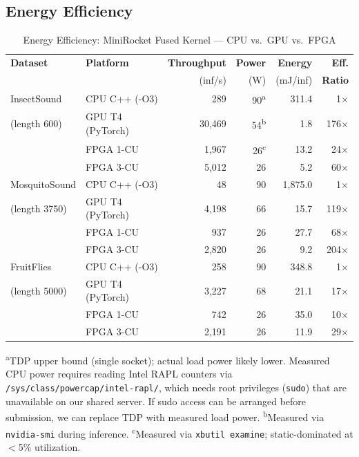 \documentclass[11pt]{article}
\begin{document}
\subsection{Energy Efficiency}

\begin{table}[H]
\centering
\caption{Energy Efficiency: MiniRocket Fused Kernel --- CPU vs.\ GPU vs.\ FPGA}
\label{tab:power}
\small
\begin{tabular}{llrrrr}
\toprule
\textbf{Dataset} & \textbf{Platform} & \textbf{Throughput} & \textbf{Power} & \textbf{Energy} & \textbf{Eff.} \\
 & & (inf/s) & (W) & (mJ/inf) & \textbf{Ratio} \\
\midrule
InsectSound & CPU C++ (-O3) & 289 & 90\textsuperscript{a} & 311.4 & 1$\times$ \\
(length 600) & GPU T4 (PyTorch) & 30{,}469 & 54\textsuperscript{b} & 1.8 & 176$\times$ \\
 & FPGA 1-CU & 1{,}967 & 26\textsuperscript{c} & 13.2 & 24$\times$ \\
 & FPGA 3-CU & 5{,}012 & 26 & 5.2 & 60$\times$ \\
\midrule
MosquitoSound & CPU C++ (-O3) & 48 & 90 & 1{,}875.0 & 1$\times$ \\
(length 3750) & GPU T4 (PyTorch) & 4{,}198 & 66 & 15.7 & 119$\times$ \\
 & FPGA 1-CU & 937 & 26 & 27.7 & 68$\times$ \\
 & FPGA 3-CU & 2{,}820 & 26 & 9.2 & 204$\times$ \\
\midrule
FruitFlies & CPU C++ (-O3) & 258 & 90 & 348.8 & 1$\times$ \\
(length 5000) & GPU T4 (PyTorch) & 3{,}227 & 68 & 21.1 & 17$\times$ \\
 & FPGA 1-CU & 742 & 26 & 35.0 & 10$\times$ \\
 & FPGA 3-CU & 2{,}191 & 26 & 11.9 & 29$\times$ \\
\bottomrule
\end{tabular}

\vspace{0.3em}

\begin{minipage}{\textwidth}
\footnotesize
\textsuperscript{a}TDP upper bound (single socket); actual load power likely lower.
Measured CPU power requires reading Intel RAPL counters via
\texttt{/sys/class/powercap/intel-rapl/}, which needs root privileges
(\texttt{sudo}) that are unavailable on our shared server. If sudo access
can be arranged before submission, we can replace TDP with measured
load power.
\textsuperscript{b}Measured via \texttt{nvidia-smi} during inference.
\textsuperscript{c}Measured via \texttt{xbutil examine}; static-dominated at $<$5\% utilization.
\end{minipage}
\end{table}
\end{document}
